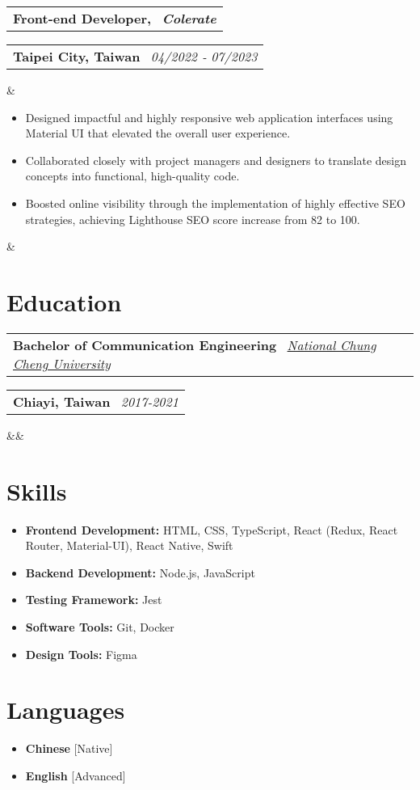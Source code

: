 \documentclass[11pt,a4paper,sans]{moderncv}
\makeatletter
\newcommand*{\customcventry}[7][.13em]{
\begin{tabular}{@{}l}
{\bfseries #4} \
{\itshape #3}
\end{tabular}
\hfill
\begin{tabular}{l@{}}
{\bfseries #5} \
{\itshape #2}
\end{tabular}
\ifx&#7&%
\else{\
\begin{minipage}{\maincolumnwidth}%
\small#7%
\end{minipage}}\fi%
\par\addvspace{#1}}
\makeatother
\begin{document}
\customcventry{04/2022 ‐ 07/2023}{\textbf{Colerate}}{Front-end Developer,}{Taipei City, Taiwan}{}{
{\begin{itemize}[leftmargin=0.6cm, label={\textbullet}]
\item Designed impactful and highly responsive web application interfaces using Material UI that elevated the overall user experience.
\item Collaborated closely with project managers and designers to translate design concepts into functional, high-quality code.
\item Boosted online visibility through the implementation of highly effective SEO strategies, achieving Lighthouse SEO score increase from 82 to 100.
\end{itemize}}}




\section{Education}

\customcventry{2017-2021}{\color{blue}\href{https://www.ccu.edu.tw/}{National Chung Cheng University}}{Bachelor of Communication Engineering}{Chiayi, Taiwan}{}{}

\section{Skills}

\begin{itemize}[label=\textbullet]
  \item \textbf{Frontend Development:} HTML, CSS, TypeScript, React (Redux, React Router, Material-UI), React Native, Swift
  \item \textbf{Backend Development:} Node.js, JavaScript
  \item \textbf{Testing Framework:} Jest
  \item \textbf{Software Tools:} Git, Docker
  \item \textbf{Design Tools:} Figma
\end{itemize}

\section{Languages}

\begin{multicols}{2}
  \begin{itemize}[label=\textbullet]
    \item \textbf{Chinese} [Native]
    \item \textbf{English} [Advanced]
  \end{itemize}
\end{multicols}
\end{document}
